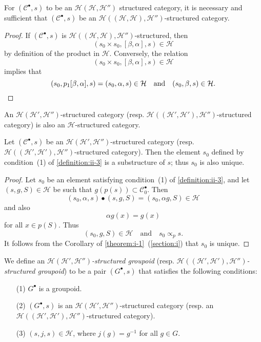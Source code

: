 \documentclass[a4paper,fleqn]{article}
\theoremstyle{plain}
\newenvironment{proposition}[1]
  {\renewcommand\theinnerproposition{#1}\innerproposition}
  {\endinnerproposition}
\theoremstyle{definition}
\newenvironment{definition}[1]
  {\renewcommand\theinnerdefinition{#1}\innerdefinition}
  {\endinnerdefinition}
\newcommand{\oldpage}[1]{{\marginpar{\footnotesize$\bigg\vert$\,\,\,\,\textit{p.~#1}}}}
\newcommand{\textand}{\quad\text{and}\quad}
\newcommand{\CC}{\mathcal{C}}
\newcommand{\HH}{\mathcal{H}}
\newcommand{\subs}{\mathrel{\propto}}
\newcommand{\smallbullet}{\bullet}
\begin{document}
\begin{proposition}{5}
\label{proposition:ii-5}
  For $(\CC^\smallbullet,s)$ to be an $\HH(\HH,\HH'')$ structured category, it is necessary and sufficient that $(\CC^\smallbullet,s)$ be an $\HH((\HH,\HH),\HH'')$-structured category.
\end{proposition}

\begin{proof}
  If $(\CC^\smallbullet,s)$ is $\HH((\HH,\HH),\HH'')$-structured, then
  \[
    (s_0\times s_0,[\beta,\alpha],s)
    \in\HH
  \]
  by definition of the product in $\HH$.
  Conversely, the relation
  \[
    (s_0\times s_0,[\beta,\alpha],s)
    \in\HH
  \]
  implies that
  \[
    (s_0,p_1[\beta,\alpha],s)
    = (s_0,\alpha,s)\in\HH
    \textand
    (s_0,\beta,s)
    \in\HH.
    \qedhere
  \]
\end{proof}

An $\HH(\HH',\HH'')$-structured category (resp. $\HH((\HH',\HH'),\HH'')$-structured category) is also an $\HH$-structured category.

\begin{proposition}{6}
\label{proposition:ii-6}
  Let $(\CC^\smallbullet,s)$ be an $\HH(\HH',\HH'')$-structured category (resp. $\HH((\HH',\HH'),\HH'')$-structured category).
  Then the element $s_0$ defined by condition~(1) of \cref{definition:ii-3} is a substructure of $s$; thus $s_0$ is also unique.
\end{proposition}

\begin{proof}
  \oldpage{384}
  Let $s_0$ be an element satisfying condition~(1) of \cref{definition:ii-3}, and let $(s,g,S)\in\HH$ be such that $g(p(s))\subset\CC_0^\smallbullet$.
  Then
  \[
    (s_0,\alpha,s)\smallbullet(s,g,S)
    = (s_0,\alpha g,S)\in\HH
  \]
  and also
  \[
    \alpha g(x)
    = g(x)
  \]
  for all $x\in p(S)$.
  Thus
  \[
    (s_0,g,S)\in\HH
    \textand
    s_0\subs_p s.
  \]
  It follows from the Corollary of \cref{theorem:i-1}~(\cref{section:i}) that $s_0$ is unique.
\end{proof}

\begin{definition}{4}
\label{definition:ii-4}
  We define an \emph{$\HH(\HH',\HH'')$-structured groupoid} (resp. \emph{$\HH((\HH',\HH'),\HH'')$-structured groupoid}) to be a pair $(G^\smallbullet,s)$ that satisfies the following conditions:
  \begin{enumerate}
    \item[\normalfont(1)]
      $G^\smallbullet$ is a groupoid.

    \item[\normalfont(2)]
      $(G^\smallbullet,s)$ is an $\HH(\HH',\HH'')$-structured category (resp. an $\HH((\HH',\HH'),\HH'')$-structured category).

    \item[\normalfont(3)]
      $(s,j,s)\in\HH$, where $j(g)=g^{-1}$ for all $g\in G$.
  \end{enumerate}
\end{definition}
\end{document}
